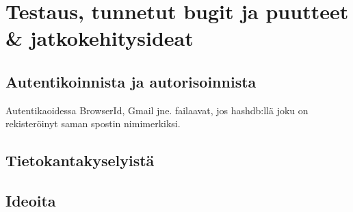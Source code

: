 \documentclass[a4paper,12pt]{report}
\begin{document}
\chapter{Testaus, tunnetut bugit ja puutteet \& jatkokehitysideat}

\section*{Autentikoinnista ja autorisoinnista}

Autentikaoidessa BrowserId, Gmail jne. failaavat, jos hashdb:llä joku on
rekisteröinyt saman spostin nimimerkiksi.

\section*{Tietokantakyselyistä}

\section*{Ideoita}


\end{document}
